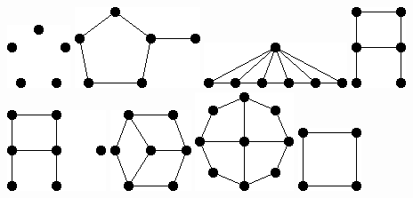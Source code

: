 \documentclass[11pt,paper=b5,footinclude,headinclude]{scrbook} %
\begin{document}
{\includegraphics[scale=0.5,frame]{smallGraphs/g_5K1.png}     
\includegraphics[scale=0.5,frame]{smallGraphs/g_5pan.png}     
\includegraphics[scale=0.5,frame]{smallGraphs/g_6fan.png}     
\includegraphics[scale=0.5,frame]{smallGraphs/g_A.png}     
\includegraphics[scale=0.5,frame]{smallGraphs/g_AUK1.png}     
\includegraphics[scale=0.5,frame]{smallGraphs/g_BW3.png}     
\includegraphics[scale=0.5,frame]{smallGraphs/g_BW4.png}     
\includegraphics[scale=0.5,frame]{smallGraphs/g_C4.png}     
}
\end{document}
